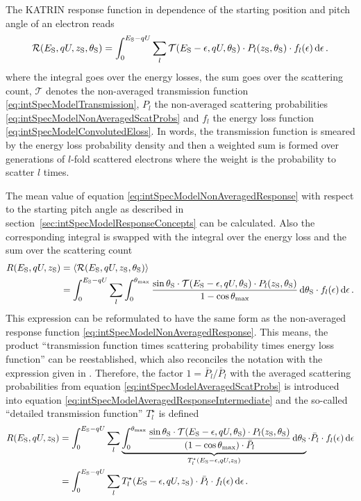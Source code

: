 The KATRIN response function in dependence of the starting position and pitch angle of an electron reads 
\begin{equation}
	\label{eq:intSpecModelNonAveragedResponse}
	\mathcal{R}(E_\mathrm{S}, qU, z_\mathrm{S}, \theta_\mathrm{S}) =
	\int_{0}^{E_\mathrm{S}-qU}
	\sum_{l}
	\mathcal{T}(E_\mathrm{S}-\epsilon, qU, \theta_\mathrm{S}) \cdot
	P_l(z_\mathrm{S}, \theta_\mathrm{S}) \cdot
	f_l(\epsilon)
	\mathop{}\!\mathrm{d} \epsilon
	\text{\,.}
\end{equation}
where the integral goes over the energy losses, the sum goes over the scattering count, $\mathcal{T}$ denotes the non-averaged transmission function \eqref{eq:intSpecModelTransmission}, $P_l$ the non-averaged scattering probabilities \eqref{eq:intSpecModelNonAveragedScatProbs} and $f_l$ the energy loss function \eqref{eq:intSpecModelConvolutedEloss}. In words, the transmission function is smeared by the energy loss probability density and then a weighted sum is formed over generations of $l$-fold scattered electrons where the weight is the probability to scatter $l$ times.

The mean value of equation \eqref{eq:intSpecModelNonAveragedResponse} with respect to the starting pitch angle as described in section~\ref{sec:intSpecModelResponseConcepts} can be calculated. Also the corresponding integral is swapped with the integral over the energy loss and the sum over the scattering count
\begin{align}
	\label{eq:intSpecModelAveragedResponseIntermediate}
	R(E_\mathrm{S}, qU, z_\mathrm{S}) &= 
	\left\langle{\mathcal{R}(E_\mathrm{S}, qU, z_\mathrm{S}, \theta_\mathrm{S})}\right\rangle \nonumber\\ &=
	\int_{0}^{E_\mathrm{S}-qU}
	\sum_{l}
	\int_{0}^{\theta_\mathrm{max}}
	\frac{
		\sin\theta_\mathrm{S} \cdot
		\mathcal{T}(E_\mathrm{S}-\epsilon, qU, \theta_\mathrm{S}) \cdot P_l(z_\mathrm{S}, \theta_\mathrm{S})
	}{1-\cos\theta_\mathrm{max}}
	\mathop{}\!\mathrm{d} \theta_\mathrm{S}
	\cdot f_l(\epsilon)
	\mathop{}\!\mathrm{d} \epsilon
	\text{\,.}
\end{align}
This expression can be reformulated to have the same form as the non-averaged response function \eqref{eq:intSpecModelNonAveragedResponse}. This means, the product ``transmission function times scattering probability times energy loss function'' can be reestablished, which also reconciles the notation  with the expression given in \cite{Groh2015}. Therefore, the factor $1=\bar{P}_l/\bar{P}_l$ with the averaged scattering probabilities from equation \eqref{eq:intSpecModelAveragedScatProbs} is introduced into equation \eqref{eq:intSpecModelAveragedResponseIntermediate} and the so-called ``detailed transmission function'' $T_l^{\star}$ is defined
\begin{align}
	R(E_\mathrm{S}, qU, z_\mathrm{S}) &=
	\int_{0}^{E_\mathrm{S}-qU}
	\sum_{l}
	\underbrace{
		\int_{0}^{\theta_\mathrm{max}}
		\frac{
			\sin\theta_\mathrm{S} \cdot
			\mathcal{T}(E_\mathrm{S}-\epsilon, qU, \theta_\mathrm{S}) \cdot P_l(z_\mathrm{S}, \theta_\mathrm{S})
		}{(1-\cos\theta_\mathrm{max}) \cdot \bar{P}_l}
		\mathop{}\!\mathrm{d} \theta_\mathrm{S}
	}_{
		T_l^{\star}(E_\mathrm{S}-\epsilon,qU,z_\mathrm{S})
	}
	\cdot \bar{P}_l \cdot f_l(\epsilon)
	\mathop{}\!\mathrm{d} \epsilon \nonumber \\ &=
	\label{eq:intSpecModelFullResponseIntermediate}
	\int_{0}^{E_\mathrm{S}-qU}
	\sum_{l}
	T_l^{\star}(E_\mathrm{S}-\epsilon,qU,z_\mathrm{S})
	\cdot \bar{P}_l \cdot f_l(\epsilon)
	\mathop{}\!\mathrm{d} \epsilon
	\text{\,.}
\end{align}



